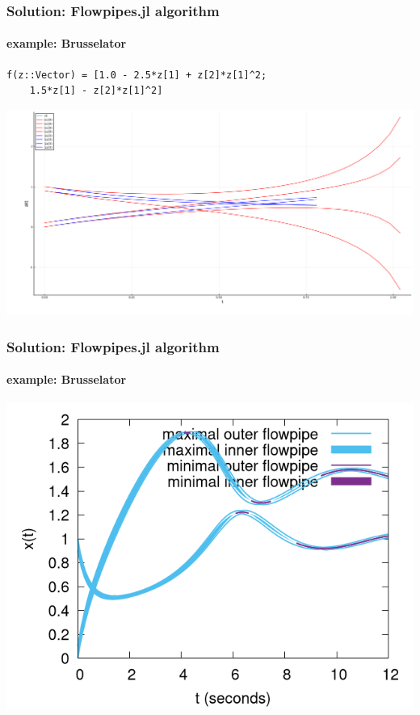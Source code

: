 \documentclass{beamer}
\begin{document}

\begin{frame}[fragile]
    \frametitle{Solution: Flowpipes.jl algorithm}
    \framesubtitle{example: Brusselator}

\begin{verbatim}
f(z::Vector) = [1.0 - 2.5*z[1] + z[2]*z[1]^2;
    1.5*z[1] - z[2]*z[1]^2]
\end{verbatim}

    \includegraphics[width=1.0\textwidth]{brusselator_long.png}

\end{frame}

\begin{frame}
    \frametitle{Solution: Flowpipes.jl algorithm}
    \framesubtitle{example: Brusselator}

    \includegraphics[width=1.0\textheight]{brusselator_compare.png}

\end{frame}
\end{document}
